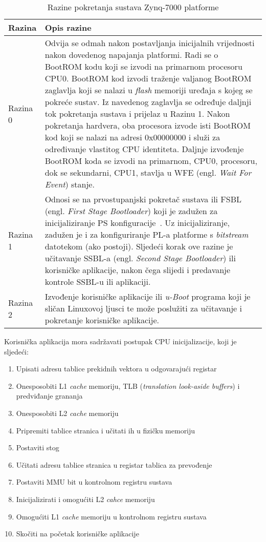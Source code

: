 \documentclass[times, utf8, diplomski, numeric]{fer}
\begin{document}
\begin{table}[H]
  \centering
  \caption{Razine pokretanja sustava Zynq-7000 platforme}
  \label{boot_stages}
  \begin{tabular}{|| p{2cm} | p{12cm} ||}
    \hline
    \textbf{Razina} & \textbf{Opis razine} \\
    \hline\hline
    Razina 0 & Odvija se odmah nakon postavljanja inicijalnih vrijednosti nakon dovedenog napajanja platformi.
    Radi se o BootROM kodu koji se izvodi na primarnom procesoru CPU0. BootROM kod izvodi traženje valjanog
    BootROM zaglavlja koji se nalazi u \textit{flash} memoriji uređaja s kojeg se pokreće sustav. Iz navedenog
    zaglavlja se određuje daljnji tok pokretanja sustava i prijelaz u Razinu 1. Nakon pokretanja hardvera, oba
    procesora izvode isti BootROM kod koji se nalazi na adresi 0x00000000 i služi za određivanje vlastitog
    CPU identiteta. Daljnje izvođenje BootROM koda se izvodi na primarnom, CPU0, procesoru, dok se sekundarni, CPU1,
    stavlja u WFE (engl. \textit{Wait For Event}) stanje.\\
    \hline
    Razina 1 & Odnosi se na prvostupanjski pokretač sustava ili FSBL (engl. \textit{First Stage Bootloader}) koji
    je zadužen za inicijaliziranje PS konfiguracije~\cite{zynq_swdg}. Uz inicijaliziranje, zadužen je i za konfiguriranje PL-a
    platforme s \textit{bitstream} datotekom (ako postoji). Sljedeći korak ove razine je učitavanje SSBL-a (engl.
    \textit{Second Stage Bootloader}) ili korisničke aplikacije, nakon čega slijedi i predavanje kontrole SSBL-u
    ili aplikaciji.\\
    \hline
    Razina 2 & Izvođenje korisničke aplikacije ili \textit{u-Boot} programa koji je sličan Linuxovoj ljusci te može
    poslužiti za učitavanje i pokretanje korisničke aplikacije.\\
    \hline
  \end{tabular}
\end{table}
Korisnička aplikacija mora sadržavati postupak CPU inicijalizacije, koji je sljedeći:
\begin{enumerate}
  \item{Upisati adresu tablice prekidnih vektora u odgovarajući registar}
  \item{Onesposobiti L1 \textit{cache} memoriju, TLB (\textit{translation look-aside buffers}) i predviđanje grananja}
  \item{Onesposobiti L2 \textit{cache} memoriju}
  \item{Pripremiti tablice stranica i učitati ih u fizičku memoriju}
  \item{Postaviti stog}
  \item{Učitati adresu tablice stranica u registar tablica za prevođenje}
  \item{Postaviti MMU bit u kontrolnom registru sustava}
  \item{Inicijalizirati i omogućiti L2 \textit{cahce} memoriju}
  \item{Omogućiti L1 \textit{cache} memoriju u kontrolnom registru sustava}
  \item{Skočiti na početak korisničke aplikacije}
\end{enumerate}
\end{document}
